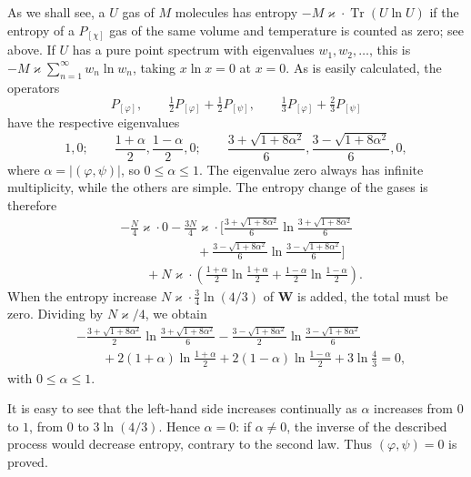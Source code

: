 \documentclass[fontsize=13pt,twoside,openany,headings=normal,parskip=false,bookmarkpackage=false,DIV=calc]{scrbook}
\begin{document}
As we shall see, a $U$ gas of $M$ molecules has entropy $-M\varkappa\cdot\operatorname{Tr}(U\ln U)$ if the entropy of a $P_{[\chi]}$ gas of the same volume and temperature is counted as zero; see above. If $U$ has a pure point spectrum with eigenvalues $w_1,w_2,\ldots$, this is $-M\varkappa\sum_{n=1}^{\infty}w_n\ln w_n$, taking $x\ln x=0$ at $x=0$. As is easily calculated, the operators
\[
P_{[\varphi]},\qquad\tfrac12P_{[\varphi]}+\tfrac12P_{[\psi]},\qquad
\tfrac13P_{[\varphi]}+\tfrac23P_{[\psi]}
\]
have the respective eigenvalues
\[
1,0;\qquad \frac{1+\alpha}2,\frac{1-\alpha}2,0;\qquad
\frac{3+\sqrt{1+8\alpha^2}}6,\frac{3-\sqrt{1+8\alpha^2}}6,0,
\]
where $\alpha=|(\varphi,\psi)|$, so $0\leq\alpha\leq1$. The eigenvalue zero always has infinite multiplicity, while the others are simple. The entropy change of the gases is therefore
\begin{align*}
&-\frac N4\varkappa\cdot0
-\frac{3N}4\varkappa\cdot\Biggl[
\frac{3+\sqrt{1+8\alpha^2}}6\ln\frac{3+\sqrt{1+8\alpha^2}}6\\
&\qquad\qquad\qquad+\frac{3-\sqrt{1+8\alpha^2}}6\ln\frac{3-\sqrt{1+8\alpha^2}}6\Biggr]\\
&\qquad+N\varkappa\cdot\left(\frac{1+\alpha}2\ln\frac{1+\alpha}2
+\frac{1-\alpha}2\ln\frac{1-\alpha}2\right).
\end{align*}
\hypertarget{origpage-200}{}%
When the entropy increase $N\varkappa\cdot\tfrac34\ln(4/3)$ of $\boldsymbol{W}$ is added, the total must be zero. Dividing by $N\varkappa/4$, we obtain
\begin{align*}
&-\frac{3+\sqrt{1+8\alpha^2}}2\ln\frac{3+\sqrt{1+8\alpha^2}}6
-\frac{3-\sqrt{1+8\alpha^2}}2\ln\frac{3-\sqrt{1+8\alpha^2}}6\\
&\qquad+2(1+\alpha)\ln\frac{1+\alpha}2
+2(1-\alpha)\ln\frac{1-\alpha}2+3\ln\frac43=0,
\end{align*}
with $0\leq\alpha\leq1$.

It is easy to see that the left-hand side increases continually as $\alpha$ increases from $0$ to $1$, from $0$ to $3\ln(4/3)$. Hence $\alpha=0$: if $\alpha\ne0$, the inverse of the described process would decrease entropy, contrary to the second law. Thus $(\varphi,\psi)=0$ is proved.
\end{document}
